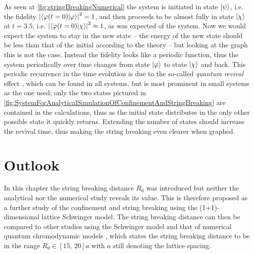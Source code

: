 \documentclass[../main.tex]{subfiles} %
\begin{document}
As seen at \cref{fig:stringBreakingNumerical} the system is initiated in state $\ket{\psi}$, i.e. the fidelity $\abs{\innerproduct{\varphi(t=0)}{\varphi}}^2 = 1$, and then proceeds to be almost fully in state $\ket{\chi}$ at $t=\num{3.5}$, i.e. $\abs{\innerproduct{\varphi(t=0)}{\chi}}^2 \approx 1$, as was expected of the system. Now we would expect the system to stay in the new state -- the energy of the new state should be less than that of the initial according to the theory -- but looking at the graph this is not the case. Instead the fidelity looks like a periodic function, thus the system periodically over time changes from state $\ket{\varphi}$ to state $\ket{\chi}$ and back. This periodic recurrence in the time evolution is due to the so-called \emph{quantum revival} effect \cite{robinett_quantumWavePacketRevivals_2004}, which can be found in all systems, but is most prominent in small systems as the one used; only the two states pictured in \cref{fig:SystemForAnalyticalSimulationOfConfinementAndStringBreaking} are contained in the calculations, thus as the initial state distributes in the only other possible state it quickly returns. Extending the number of states should increase the revival time, thus making the string breaking even clearer when graphed.





\section{Outlook} \label{sec:Outlook}

In this chapter the string breaking distance $R_0$ was introduced but neither the analytical nor the numerical study reveals its value. This is therefore proposed as a further study of the confinement and string breaking using the (1+1)-dimensional lattice Schwinger model. The string breaking distance can then be compared to other studies using the Schwinger model \cite{buyens_confinementAndStringBreaking_2016} and that of numerical quantum chromodynamic models \cite{petkovic_stringBreakingAndQuarkConfinement_2018, bulava_stringBreakingByLightAndStrangeQuarksInQCD_2019}, which states the string breaking distance to be in the range $R_0 \in [15,\, 20]a$ with $a$ still denoting the lattice spacing.
\end{document}
